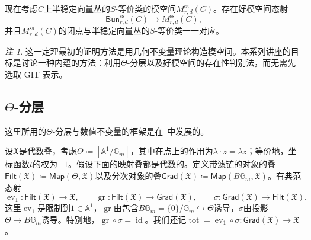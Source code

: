\documentclass{amsart}
\theoremstyle{definition}
\theoremstyle{remark}
\newtheorem{rmk}[thm]{注}
\theoremstyle{plain}
\theoremstyle{definition}
\theoremstyle{remark}
\newcommand{\A}{\mathbb{A}}
\newcommand{\G}{\mathbb{G}}
\newcommand{\mf}[1]{\mathfrak{#1}}
\newcommand{\mr}[1]{\mathrm{#1}}
\newcommand{\on}[1]{\operatorname{#1}}
\newcommand{\ms}[1]{\mathsf{#1}}
\newcommand{\1}{\mathbf{1}}
\newcommand{\2}{\mathbf{2}}
\newcommand{\3}{\mathbf{3}}
\DeclareMathOperator{\ev}{ev}
\begin{document}
现在考虑\(C\)上半稳定向量丛的\(S\)-等价类的模空间\(M_{r,d}^{\mr{ss}}(C)\)。存在好模空间态射
\[
    \ms{Bun}_{r,d}^{\mr{ss}}(C)\longrightarrow M_{r,d}^{\mr{ss}}(C),
\]
并且\(M_{r,d}^{\mr{ss}}(C)\)的闭点与半稳定向量丛的\(S\)-等价类一一对应。

\begin{rmk}
    这一定理最初的证明方法是用几何不变量理论构造模空间。本系列讲座的目标是讨论一种内蕴的方法：利用\(\Theta\)-分层以及好模空间的存在性判别法，而无需先选取 GIT 表示。
\end{rmk}


\subsection{\texorpdfstring{\(\Theta\)}{Θ}-分层}%
\label{sub:Theta-stratifications}

这里所用的\(\Theta\)-分层与数值不变量的框架是在~\cite{HLinstability}中发展的。

设\(\mf{X}\)是代数叠，考虑\(\Theta\coloneqq[\A^1/\G_m]\)，其中在点上的作用为\(\lambda\cdot z=\lambda z\)；等价地，坐标函数\(t\)的权为\(-1\)。假设下面的映射叠都是代数的。定义带滤链的对象的叠\(\ms{Filt}(\mf{X})\coloneqq\ms{Map}(\Theta,\mf{X})\)以及分次对象的叠\(\ms{Grad}(\mf{X})\coloneqq\ms{Map}(B\G_m,\mf{X})\)。有典范态射
\[
    \ev_1\colon\ms{Filt}(\mf{X})\to\mf{X},
    \qquad
    \on{gr}\colon\ms{Filt}(\mf{X})\to\ms{Grad}(\mf{X}),
    \qquad
    \sigma\colon\ms{Grad}(\mf{X})\to\ms{Filt}(\mf{X}).
\]
这里\(\ev_1\)是限制到\(1\in\A^1\)，\(\on{gr}\)由包含\(B\G_m=\{0\}/\G_m\hookrightarrow\Theta\)诱导，\(\sigma\)由投影\(\Theta\to B\G_m\)诱导。特别地，\(\on{gr}\circ\sigma=\on{id}\)。我们还记\(\on{tot}=\ev_1\circ\sigma\colon\ms{Grad}(\mf{X})\to\mf{X}\)。
\end{document}
